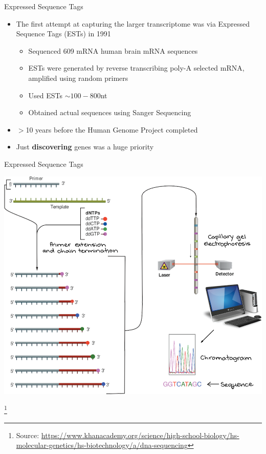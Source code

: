 \documentclass[aspectratio=169,11pt]{beamer}
\newcommand\blfootnote[1]{%
  \begingroup
  \renewcommand\thefootnote{}\footnote{#1}%
  \addtocounter{footnote}{-1}%
  \endgroup
}
\begin{document}
\begin{frame}{Expressed Sequence Tags}

	\begin{itemize}
		\item The first attempt at capturing the larger transcriptome was via Expressed Sequence Tags (ESTs) in 1991
		\begin{itemize}
			\item Sequenced 609 mRNA human brain mRNA sequences
			\item ESTs were generated by reverse transcribing poly-A selected mRNA, amplified using random primers
			\item Used ESTs $\sim 100-800$nt
			\item Obtained actual sequences using Sanger Sequencing
		\end{itemize}
		\item $>$10 years before the Human Genome Project completed
		\item Just \textbf{discovering} genes was a huge priority
	\end{itemize}

\end{frame}

\begin{frame}{Expressed Sequence Tags}

	\begin{center}
	\includegraphics[scale=0.2]{figures/sanger.png} 
	\end{center}
	
	\blfootnote{Source: \url{https://www.khanacademy.org/science/high-school-biology/hs-molecular-genetics/hs-biotechnology/a/dna-sequencing}}

\end{frame}
\end{document}
